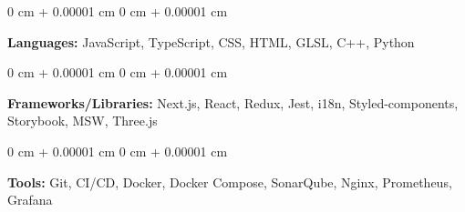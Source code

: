 \documentclass[10pt, letterpaper]{article}
\newenvironment{onecolentry}{
    \begin{adjustwidth}{
        0 cm + 0.00001 cm
    }{
        0 cm + 0.00001 cm
    }
}{
    \end{adjustwidth}
} %
\begin{document}
        \begin{onecolentry}
            \textbf{Languages:} JavaScript, TypeScript, CSS, HTML, GLSL, C++, Python
        \end{onecolentry}

        \vspace{0.2 cm}

        \begin{onecolentry}
            \textbf{Frameworks/Libraries:} Next.js, React, Redux, Jest, i18n, Styled-components, Storybook, MSW, Three.js
        \end{onecolentry}

        \vspace{0.2 cm}

        \begin{onecolentry}
            \textbf{Tools:} Git, CI/CD, Docker, Docker Compose, SonarQube, Nginx, Prometheus, Grafana
        \end{onecolentry}
\end{document}
